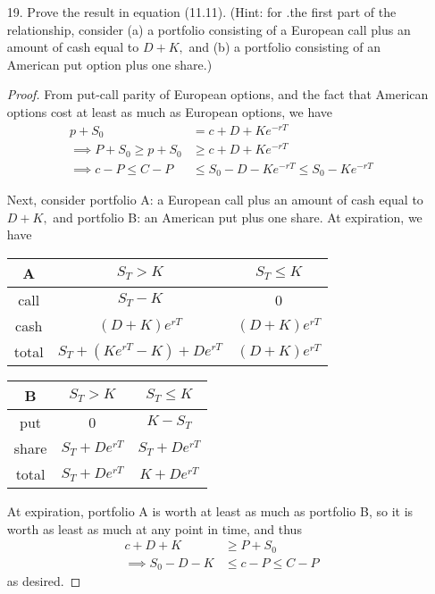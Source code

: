 \documentclass{article}
\begin{document}
\begin{itemize}
	\item[19.] Prove the result in equation (11.11). (Hint: for .the first part of the relationship, consider (a) a portfolio consisting of a European call plus an amount of cash equal to $D+K,$ and (b) a portfolio consisting of an American put option plus one share.)
		\begin{proof}
			From put-call parity of European options, and the fact that American options cost at least as much as European options, we have
			\begin{align*}
				p+S_0 &= c+D+Ke^{-rT} \\
				\implies P + S_0 \ge p+S_0 &\ge c+D+Ke^{-rT} \\
				\implies c-P \le C-P &\le S_0-D-Ke^{-rT} \le S_0-Ke^{-rT}
			\end{align*}

			Next, consider portfolio A: a European call plus an amount of cash equal to $D+K,$ and portfolio B: an American put plus one share. At expiration, we have
			\begin{center}
				\begin{tabular}{c|cc}
					A & $S_T>K$ & $S_T\le K$ \\
					\hline
					call & $S_T-K$ & 0 \\
					cash & $(D+K)e^{rT}$ & $(D+K)e^{rT}$ \\
					\hline
					total & $S_T+(Ke^{rT}-K) + De^{rT}$ & $(D+K)e^{rT}$
				\end{tabular}
			\end{center}
			\begin{center}
				\begin{tabular}{c|cc}
					B & $S_T>K$ & $S_T\le K$ \\
					\hline
					put & 0 & $K-S_T$ \\
					share & $S_T + De^{rT}$ & $S_T + De^{rT}$ \\
					\hline
					total & $S_T + De^{rT}$ & $K + De^{rT}$
				\end{tabular}
			\end{center}
			At expiration, portfolio A is worth at least as much as portfolio B, so it is worth as least as much at any point in time, and thus
			\begin{align*}
				c+D+K &\ge P+S_0 \\
				\implies S_0-D-K &\le c-P \le C-P
			\end{align*}
			as desired.
		\end{proof}


\end{itemize}
\end{document}
